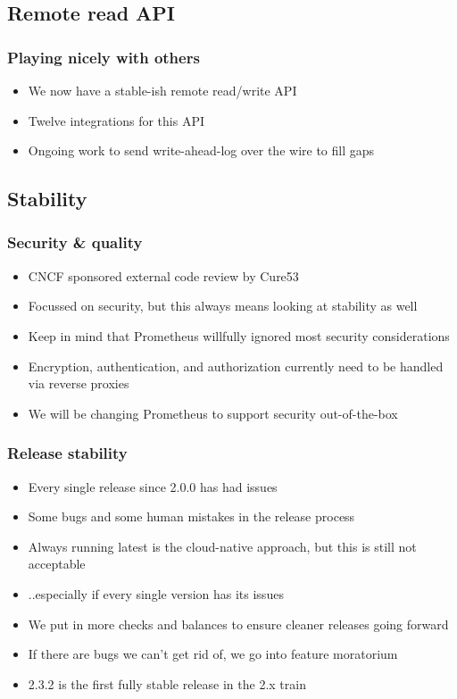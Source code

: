 \documentclass[t]{beamer}
\begin{document}
\subsection{Remote read API}

\begin{frame}
	\frametitle{Playing nicely with others}
	\begin{itemize}
		\item We now have a stable-ish remote read/write API
		\item Twelve integrations for this API
		\item Ongoing work to send write-ahead-log over the wire to fill gaps
	\end{itemize}
\end{frame}


\subsection{Stability}

\begin{frame}
	\frametitle{Security \& quality}
	\begin{itemize}
		\item CNCF sponsored external code review by Cure53
		\item Focussed on security, but this always means looking at stability as well
		\item Keep in mind that Prometheus willfully ignored most security considerations
		\item Encryption, authentication, and authorization currently need to be handled via reverse proxies
		\item We will be changing Prometheus to support security out-of-the-box
	\end{itemize}
\end{frame}

\begin{frame}
	\frametitle{Release stability}
	\begin{itemize}
		\item Every single release since 2.0.0 has had issues
		\item Some bugs and some human mistakes in the release process
		\item Always running latest is the cloud-native approach, but this is still not acceptable
		\item ..especially if every single version has its issues
		\item We put in more checks and balances to ensure cleaner releases going forward
		\item If there are bugs we can't get rid of, we go into feature moratorium
		\item 2.3.2 is the first fully stable release in the 2.x train
	\end{itemize}
\end{frame}
\end{document}
